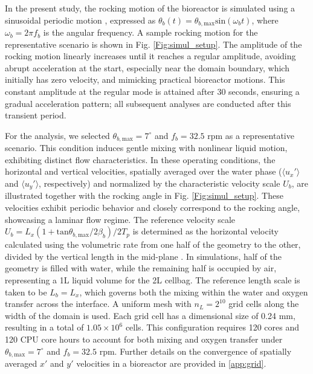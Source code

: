 \documentclass[final,3p,times,twocolumn,authoryear]{elsarticle}
\theoremstyle{definition}
\begin{document}
In the present study, the rocking motion of the bioreactor is simulated using a sinusoidal periodic motion \citep{Zhan2019}, expressed as $\theta_b(t) = \theta_{b,\textrm{max}} \mathrm{sin}(\omega_b t)$, where $\omega_b = 2\pi f_b$ is the angular frequency. A sample rocking motion for the representative scenario is shown in Fig. \ref{Fig:simul_setup}. The amplitude of the rocking motion linearly increases until it reaches a regular amplitude, avoiding abrupt acceleration at the start, especially near the domain boundary, which initially has zero velocity, and mimicking practical bioreactor motions. This constant amplitude at the regular mode is attained after 30 seconds, ensuring a gradual acceleration pattern; all subsequent analyses are conducted after this transient period.

For the analysis, we selected $\theta_{b,\textrm{max}} = 7^\circ$ and $f_b=32.5$ rpm as a representative scenario. This condition induces gentle mixing with nonlinear liquid motion, exhibiting distinct flow characteristics. In these operating conditions, the horizontal and vertical velocities, spatially averaged over the water phase ($\langle u_x'\rangle$ and $\langle u_y'\rangle$, respectively) and normalized by the characteristic velocity scale $U_b$, are illustrated together with the rocking angle in Fig. \ref{Fig:simul_setup}. These velocities exhibit periodic behavior and closely correspond to the rocking angle, showcasing a laminar flow regime. The reference velocity scale $U_b=L_x(1+\mathrm{tan}\theta_{b,\textrm{max}}/2\beta_b)/2T_p$ is determined as the horizontal velocity calculated using the volumetric rate from one half of the geometry to the other, divided by the vertical length in the mid-plane \citep{Marsh2017}. In simulations, half of the geometry is filled with water, while the remaining half is occupied by air, representing a 1L liquid volume for the 2L cellbag. The reference length scale is taken to be $L_b=L_x$, which governs both the mixing within the water and oxygen transfer across the interface. A uniform mesh with $n_L=2^{10}$ grid cells along the width of the domain is used. Each grid cell has a dimensional size of 0.24 mm, resulting in a total of $1.05 \times 10^6$ cells. This configuration requires 120 cores and 120 CPU core hours to account for both mixing and oxygen transfer under $\theta_{b,\textrm{max}} = 7^\circ$ and $f_b=32.5$ rpm. Further details on the convergence of spatially averaged $x'$ and $y'$ velocities in a bioreactor are provided in \ref{app:grid}. 
\end{document}
